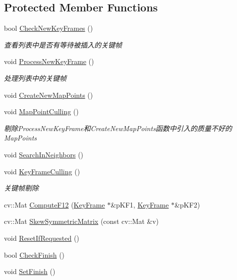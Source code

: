 \subsection*{Protected Member Functions}
\begin{DoxyCompactItemize}
\item 
bool \mbox{\hyperlink{class_o_r_b___s_l_a_m2_1_1_local_mapping_a27db88f75fe6f2bd43b0bd0769d56462}{Check\+New\+Key\+Frames}} ()
\begin{DoxyCompactList}\small\item\em 查看列表中是否有等待被插入的关键帧 \end{DoxyCompactList}\item 
void \mbox{\hyperlink{class_o_r_b___s_l_a_m2_1_1_local_mapping_a84eea8f268cce9d919a4906ae634dd22}{Process\+New\+Key\+Frame}} ()
\begin{DoxyCompactList}\small\item\em 处理列表中的关键帧 \end{DoxyCompactList}\item 
void \mbox{\hyperlink{class_o_r_b___s_l_a_m2_1_1_local_mapping_ac06b513357429d9eff89e29d2ae58d6c}{Create\+New\+Map\+Points}} ()
\item 
void \mbox{\hyperlink{class_o_r_b___s_l_a_m2_1_1_local_mapping_acbbb8f04b15e3250e0e24070825d19ae}{Map\+Point\+Culling}} ()
\begin{DoxyCompactList}\small\item\em 剔除\+Process\+New\+Key\+Frame和\+Create\+New\+Map\+Points函数中引入的质量不好的\+Map\+Points \end{DoxyCompactList}\item 
void \mbox{\hyperlink{class_o_r_b___s_l_a_m2_1_1_local_mapping_a5d5e0bc6fd15d9a6bf1ca8a258f104f1}{Search\+In\+Neighbors}} ()
\item 
void \mbox{\hyperlink{class_o_r_b___s_l_a_m2_1_1_local_mapping_aca73e5b4bace436b235dfa9c9a522b19}{Key\+Frame\+Culling}} ()
\begin{DoxyCompactList}\small\item\em 关键帧剔除 \end{DoxyCompactList}\item 
cv\+::\+Mat \mbox{\hyperlink{class_o_r_b___s_l_a_m2_1_1_local_mapping_ac72419089ac268253671b8da2ec12c21}{Compute\+F12}} (\mbox{\hyperlink{class_o_r_b___s_l_a_m2_1_1_key_frame}{Key\+Frame}} $\ast$\&p\+K\+F1, \mbox{\hyperlink{class_o_r_b___s_l_a_m2_1_1_key_frame}{Key\+Frame}} $\ast$\&p\+K\+F2)
\item 
cv\+::\+Mat \mbox{\hyperlink{class_o_r_b___s_l_a_m2_1_1_local_mapping_a4c5c0c57b580767a1dd642d77ad8179a}{Skew\+Symmetric\+Matrix}} (const cv\+::\+Mat \&v)
\item 
void \mbox{\hyperlink{class_o_r_b___s_l_a_m2_1_1_local_mapping_a3fe34beadb62eaa9446c96d27a5d12c9}{Reset\+If\+Requested}} ()
\item 
bool \mbox{\hyperlink{class_o_r_b___s_l_a_m2_1_1_local_mapping_a872cbbdab3f88ffc2d9d395ef2cf0e8d}{Check\+Finish}} ()
\item 
void \mbox{\hyperlink{class_o_r_b___s_l_a_m2_1_1_local_mapping_a1a6e5b76640d7584b749567d0328ccdc}{Set\+Finish}} ()
\end{DoxyCompactItemize}
